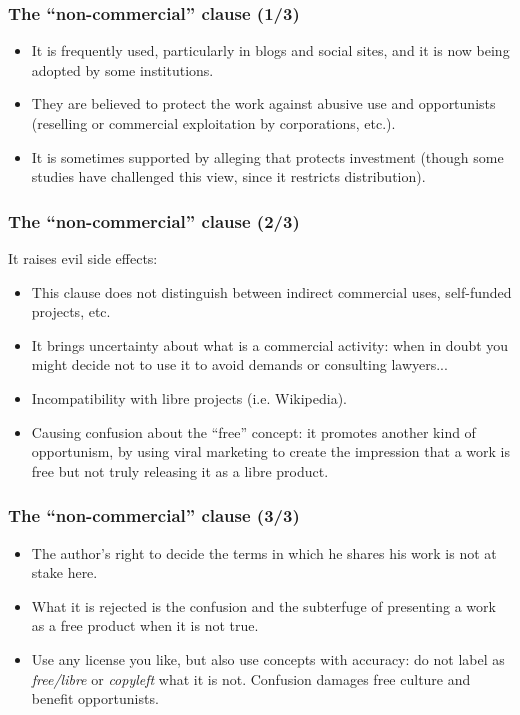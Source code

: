 
\begin{frame}
\frametitle{The ``non-commercial'' clause (1/3)}

\begin{itemize}
\item It is frequently used, particularly in blogs and social sites, and it is now being adopted by some institutions.
\item They are believed to protect the work against abusive use and opportunists (reselling or commercial exploitation by corporations, etc.).
\item It is sometimes supported by alleging that protects investment (though some studies have challenged this view, since it restricts distribution).
\end{itemize}                                                 

\end{frame}


\begin{frame}
\frametitle{The ``non-commercial'' clause (2/3)}

It raises evil side effects: 
\begin{itemize}
\item This clause does not distinguish between indirect commercial uses, self-funded projects, etc.
\item It brings uncertainty about what is a commercial activity: when in doubt you might decide not to use it to avoid demands or consulting lawyers... 
\item Incompatibility with libre projects (i.e. Wikipedia).
\item Causing confusion about  the ``free'' concept: it promotes another kind of opportunism, by using viral marketing to create the impression that a work is free but not truly releasing it as a libre product.
\end{itemize}                                                 

\end{frame}


\begin{frame}
\frametitle{The ``non-commercial'' clause (3/3)}

\begin{itemize}
\item The author's right to decide the terms in which he shares his work is not at stake here.
\item What it is rejected is the confusion and the subterfuge of presenting a work as a free product when it is not true.
\item Use any license you like, but also use concepts with accuracy: do not label as \textit{free/libre} or \textit{copyleft} what it is not. Confusion damages free culture and benefit opportunists.
\end{itemize}
\end{frame}

